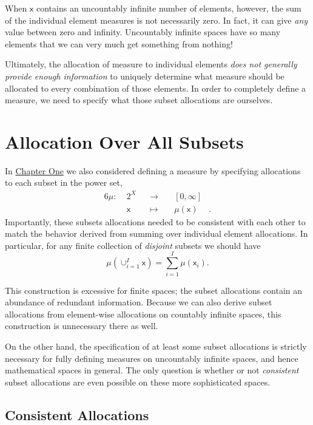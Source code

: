\documentclass[
  letterpaper,
  DIV=11,
  numbers=noendperiod]{scrartcl}
\begin{document}
When \(\mathsf{x}\) contains an uncountably infinite number of elements,
however, the sum of the individual element measures is not necessarily
zero. In fact, it can give \emph{any} value between zero and infinity.
Uncountably infinite spaces have so many elements that we can very much
get something from nothing!

Ultimately, the allocation of measure to individual elements \emph{does
not generally provide enough information} to uniquely determine what
measure should be allocated to every combination of those elements. In
order to completely define a measure, we need to specify what those
subset allocations are ourselves.

\section{Allocation Over All Subsets}\label{allocation-over-all-subsets}

In
\href{http://www.symplectomorphic.com/assets/chapters_html/probability_on_finite_sets.html}{Chapter
One} we also considered defining a measure by specifying allocations to
each subset in the power set, \begin{alignat*}{6}
\mu :\; & 2^{X} & &\rightarrow& \; & [0, \infty] &
\\
& \mathsf{x} & &\mapsto& & \mu(\mathsf{x}) &.
\end{alignat*} Importantly, these subsets allocations needed to be
consistent with each other to match the behavior derived from summing
over individual element allocations. In particular, for any finite
collection of \emph{disjoint} subsets we should have \[
\mu( \cup_{i = 1}^{I} \mathsf{x} )
=
\sum_{i = 1}^{I} \mu( \mathsf{x}_{i}).
\]

This construction is excessive for finite spaces; the subset allocations
contain an abundance of redundant information. Because we can also
derive subset allocations from element-wise allocations on countably
infinite spaces, this construction is unnecessary there as well.

On the other hand, the specification of at least some subset allocations
is strictly necessary for fully defining measures on uncountably
infinite spaces, and hence mathematical spaces in general. The only
question is whether or not \emph{consistent} subset allocations are even
possible on these more sophisticated spaces.

\subsection{Consistent Allocations}\label{consistent-allocations}
\end{document}

